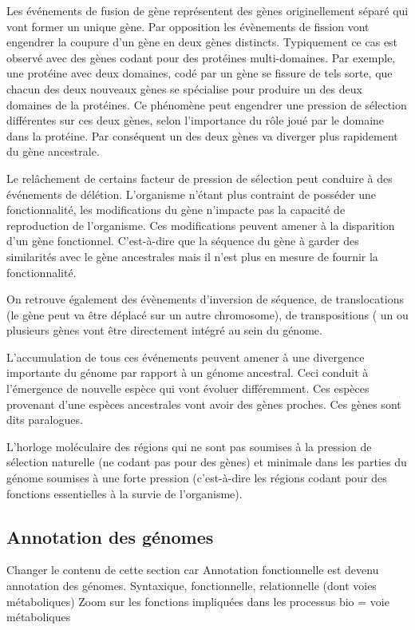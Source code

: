 \begin{refsection}
    Les événements de fusion de gène représentent des gènes originellement séparé qui vont former un unique gène. Par opposition les évènements de fission vont  engendrer la coupure d’un gène en deux gènes distincts. Typiquement ce cas est observé avec des gènes codant pour des protéines multi-domaines. Par exemple, une protéine avec deux domaines, codé par un gène se fissure de tels sorte, que chacun des deux nouveaux gènes se spécialise pour produire un des deux domaines de la protéines. Ce phénomène peut engendrer une pression de sélection différentes sur ces deux gènes, selon l’importance du rôle joué par le domaine dans la protéine. Par conséquent un des deux gènes va diverger plus rapidement du gène ancestrale.
    
    Le relâchement de certains facteur de pression de sélection peut conduire à des événements de délétion. L’organisme n’étant plus contraint de posséder une fonctionnalité, les modifications du gène n’impacte pas la capacité de reproduction de l’organisme. Ces modifications peuvent amener à la disparition d’un gène fonctionnel. C’est-à-dire que la séquence du gène à garder des similarités avec le gène ancestrales mais il n’est plus en mesure de fournir la fonctionnalité.
    
    On retrouve également des évènements d’inversion de séquence, de translocations (le gène peut va être déplacé sur un autre chromosome), de transpositions ( un ou plusieurs gènes vont être directement intégré au sein du génome.
    
    L’accumulation de tous ces événements peuvent amener  à une divergence importante du génome par rapport à un génome ancestral. Ceci conduit à l’émergence de nouvelle espèce qui vont évoluer différemment. Ces espèces provenant d’une espèces ancestrales vont avoir des gènes proches. Ces gènes sont dits paralogues.
    
    L’horloge moléculaire des régions qui ne sont pas soumises à la pression de sélection naturelle (ne codant pas pour des gènes) et minimale dans les parties du génome soumises à une forte pression (c'est-à-dire les régions codant pour des fonctions essentielles à la survie de l'organisme).
    
    
    \subsection{Annotation des génomes}
    Changer le contenu de cette section car Annotation fonctionnelle est devenu annotation des génomes.
    Syntaxique, fonctionnelle, relationnelle (dont voies métaboliques) Zoom sur les fonctions impliquées dans les processus bio = voie métaboliques
    

\end{refsection}
